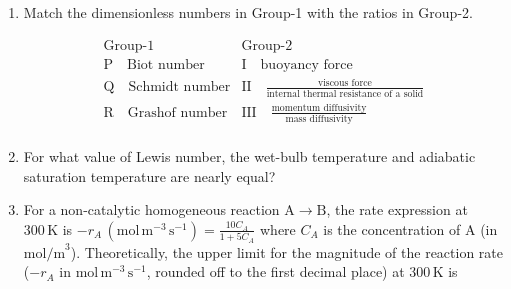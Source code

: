 \documentclass[journal,12pt,onecolumn]{IEEEtran}
\theoremstyle{remark}
\begin{document}
\begin{enumerate}
\item Match the dimensionless numbers in Group-1 with the ratios in Group-2.

\[\begin{array}{cc}\text{Group-1} & \text{Group-2} \\\hline\text{P} \quad \text{Biot number} & \text{I} \quad \text{buoyancy force} \\\text{Q} \quad \text{Schmidt number} & \text{II} \quad \frac{\text{viscous force}}{\text{internal thermal resistance of a solid}} \\\text{R} \quad \text{Grashof number} & \text{III} \quad \frac{\text{momentum diffusivity}}{\text{mass diffusivity}} \\\end{array}\]
\hfill{}
\begin{enumerate}
\end{enumerate}

\item For what value of Lewis number, the wet-bulb temperature and adiabatic saturation temperature are nearly equal?
\hfill{}
\begin{enumerate}
\end{enumerate}

\item For a non-catalytic homogeneous reaction $\mathrm{A} \rightarrow \mathrm{B}$, the rate expression at $300 \, \mathrm{K}$ is 
$-r_A \, (\mathrm{mol} \, \mathrm{m}^{-3} \, \mathrm{s}^{-1}) = \frac{10C_A}{1+5C_A}$ where $C_A$ is the concentration of A (in $\mathrm{mol/m}^3$). Theoretically, the upper limit for the magnitude of the reaction rate ($-r_A$ in $\mathrm{mol} \, \mathrm{m}^{-3} \, \mathrm{s}^{-1}$, rounded off to the first decimal place) at $300 \, \mathrm{K}$ is \underline{\hspace{1cm}}
\hfill{}


\end{enumerate}
\end{document}
